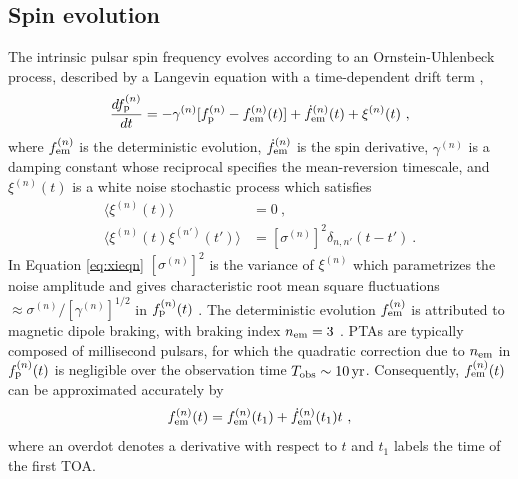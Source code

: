 \documentclass[fleqn,usenatbib,useAMS]{mnras}
\begin{document}
\subsection{Spin evolution} \label{sec:psr_frequency}
The intrinsic pulsar spin frequency evolves according to an Ornstein-Uhlenbeck process, described by a Langevin equation with a time-dependent drift term \citep{Vargas},
\begin{equation}
	\frac{df_{\rm p}^{(n)}}{dt} = -\gamma^{(n)}	 [f_{\rm p}^{(n)} - f_{\rm em}^{(n)} (t)] + \dot{f}_{\rm em}^{(n)}(t) +\xi^{(n)}(t) \ , 
	\label{eq:frequency_evolution}
\end{equation}
where $f_{\rm em}^{(n)}$ is the deterministic evolution, $\dot{f}_{\rm em}^{(n)}$ is the spin derivative, $\gamma^{(n)}$ is a damping constant whose reciprocal specifies the mean-reversion timescale, and $\xi^{(n)}(t)$ is a white noise stochastic process which satisfies
\begin{align}
	\langle \xi^{(n)}(t) \rangle &= 0 \ , \\
	\langle \xi^{(n)}(t) \xi^{(n')}(t') \rangle &= [\sigma^{(n)}]^2 \delta_{n,n'}(t - t') \ .	\label{eq:xieqn}
\end{align}
In Equation \eqref{eq:xieqn} $[\sigma^{(n)}]^2$ is the variance of $\xi^{(n)}$ which parametrizes the noise amplitude and gives characteristic root mean square fluctuations $\approx \sigma^{(n)} / [\gamma^{(n)}]^{1/2}$ in $f_{\rm p}^{(n)}(t)$ \citep{gardiner2009stochastic}. The deterministic evolution $f_{\rm em}^{(n)}$ is attributed to magnetic dipole braking, with braking index $n_{\rm em}=3$ \citep{1969ApJ...157..869G}. PTAs are typically composed of millisecond pulsars, for which the quadratic correction due to $n_{\rm em}$ in $f_{\rm p}^{(n)}(t)$ is negligible over the observation time $T_{\rm obs} \sim 10 \, {\rm yr}$. Consequently, 	$f_{\rm em}^{(n)}(t)$ can be approximated accurately by 
\begin{equation}
	f_{\rm em}^{(n)}(t) = f_{\rm em}^{(n)}(t_1) + \dot{f}_{\rm em}^{(n)}(t_1)t \ , \label{eq:spinevol}
\end{equation} 
where an overdot denotes a derivative with respect to $t$ and $t_1$ labels the time of the first TOA. \newline 
\end{document}
